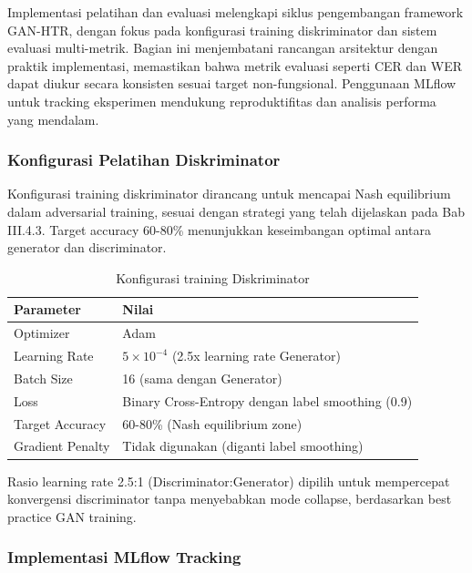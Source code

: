 \documentclass[12pt,a4paper]{article}
\begin{document}
Implementasi pelatihan dan evaluasi melengkapi siklus pengembangan framework GAN-HTR, dengan fokus pada konfigurasi training diskriminator dan sistem evaluasi multi-metrik. Bagian ini menjembatani rancangan arsitektur dengan praktik implementasi, memastikan bahwa metrik evaluasi seperti CER dan WER dapat diukur secara konsisten sesuai target non-fungsional. Penggunaan MLflow untuk tracking eksperimen mendukung reproduktifitas dan analisis performa yang mendalam.

\subsubsection{Konfigurasi Pelatihan Diskriminator}
\label{subsubsec:discriminator-training}

Konfigurasi training diskriminator dirancang untuk mencapai Nash equilibrium dalam adversarial training, sesuai dengan strategi yang telah dijelaskan pada Bab III.4.3. Target accuracy 60-80\% menunjukkan keseimbangan optimal antara generator dan discriminator.

\begin{table}[H]
\centering
\caption{Konfigurasi training Diskriminator}
\label{tab:discriminator-config}
\small
\begin{tabular}{|l|l|}
\hline
\textbf{Parameter} & \textbf{Nilai} \\
\hline
Optimizer & Adam \\
\hline
Learning Rate & $5 \times 10^{-4}$ (2.5x learning rate Generator) \\
\hline
Batch Size & 16 (sama dengan Generator) \\
\hline
Loss & Binary Cross-Entropy dengan label smoothing (0.9) \\
\hline
Target Accuracy & 60-80\% (Nash equilibrium zone) \\
\hline
Gradient Penalty & Tidak digunakan (diganti label smoothing) \\
\hline
\end{tabular}
\end{table}

Rasio learning rate 2.5:1 (Discriminator:Generator) dipilih untuk mempercepat konvergensi discriminator tanpa menyebabkan mode collapse, berdasarkan best practice GAN training.

\subsubsection{Implementasi MLflow Tracking}
\label{subsubsec:mlflow-implementation}
\end{document}
